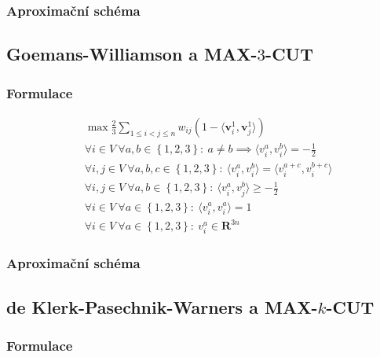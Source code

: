 \subsubsection*{Aproximační schéma}


\subsection{Goemans-Williamson a MAX-$3$-CUT}

\subsubsection*{Formulace}

\begin{equation}\tag{GW-MAX-$3$-CUT}
    \begin{split}
        &\max \frac{2}{3} \sum_{1 \leq i < j \leq n} w_{ij} (1 - \langle \mathbf{v}_i^1, \mathbf{v}_j^1 \rangle) \\
        &\forall i \in V\ \forall a,b \in \left\{ 1,2,3 \right\}:\ a \neq b \implies \langle v_i^a, v_i^b \rangle = -\frac{1}{2} \\
        &\forall i,j \in V\ \forall a,b,c \in \left\{ 1,2,3 \right\}:\ \langle v_i^a, v_i^b \rangle = \langle v_i^{a+c}, v_i^{b+c} \rangle \\
        &\forall i,j \in V\ \forall a,b \in \left\{ 1,2,3 \right\}:\ \langle v_i^a, v_j^b \rangle \geq -\frac{1}{2} \\
        &\forall i \in V\ \forall a \in \left\{ 1,2,3 \right\}:\ \langle v_i^a, v_i^a \rangle = 1 \\
        &\forall i \in V\ \forall a \in \left\{ 1,2,3 \right\}:\ v_i^a \in \mathbf{R}^{3n}
    \end{split}
    \label{eq:GW-MAX-3-CUT}
\end{equation}

\subsubsection*{Aproximační schéma}

\subsection{de Klerk-Pasechnik-Warners a MAX-$k$-CUT}

\subsubsection*{Formulace}

